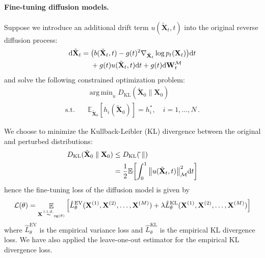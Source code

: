 \documentclass{article}
\theoremstyle{plain}
\theoremstyle{definition}
\theoremstyle{remark}
\DeclareMathOperator*{\argmin}{arg\,min}
\let\P\relax
\DeclareMathOperator{\P}{\mathbb{P}}
\DeclareMathOperator{\E}{\mathbb{E}}
\DeclareMathOperator{\sg}{\mathrm{sg}}
\DeclareMathOperator{\iid}{\overset{\mathrm{i.i.d.}}{\sim}}
\begin{document}
\paragraph{Fine-tuning diffusion models.}
Suppose we introduce an additional drift term $u(\tilde{\mathbf{X}}_t, t)$ into the original reverse diffusion process:
    \begin{equation}
        \begin{aligned}
            \dd\tilde{\mathbf{X}}_t ={} &
            \qty(b(\tilde{\mathbf{X}}_t, t)
            - g(t)^2\nabla_{\tilde{\mathbf{X}}_t}\log p_t(\mathbf{X}_t))\dd t   \\
                                        & + g(t)u(\tilde{\mathbf{X}}_t, t)\dd t
            + g(t)\dd \mathbf{W}_t^\mathcal{M}
        \end{aligned}
    \end{equation}
    and solve the following constrained optimization problem:
    \begin{equation}
        \begin{aligned}
            & \argmin_{u} D_\text{KL}(\tilde{\mathbf{X}}_0\parallel \mathbf{X}_0)   \\
            \text{s.t.} \quad
            & \mathbb{E}_{\tilde{\mathbf{X}}_0}[h_i(\tilde{\mathbf{X}}_0)] = h_i^*,
            \quad i = 1,\dots,N\,.
        \end{aligned}
    \end{equation}

    We choose to minimize the Kullback-Leibler (KL) divergence between the original and perturbed distributions:
    \begin{equation}
        \begin{aligned}
            D_\text{KL}(\tilde{\mathbf{X}}_0\parallel \mathbf{X}_0) & \leq D_\text{KL}(\tilde{\P}\parallel \P) \\
            & = \frac{1}{2}\mathbb{E}_{\tilde{\P}} \qty[\int_0^1 \norm{u(\tilde{\mathbf{X}}_t, t)}_\mathcal{M}^2 \dd t]
        \end{aligned}
    \end{equation}
    hence the fine-tuning loss of the diffusion model is given by
    \begin{equation}
        \mathcal{L}(\theta) = \E_{\mathbf{X} \iid \P_{\sg(\theta)}}\qty[\hat{L}_\theta^\text{EV}(\mathbf{X}^{(1)}, \mathbf{X}^{(2)}, \dots, \mathbf{X}^{(M)}) + \lambda\hat{L}_\theta^\text{KL}(\mathbf{X}^{(1)}, \mathbf{X}^{(2)}, \dots, \mathbf{X}^{(M)})]
    \end{equation}
    where $\hat{L}_\theta^\text{EV}$ is the empirical variance loss and $\hat{L}_\theta^\text{KL}$ is the empirical KL divergence loss. We have also applied the leave-one-out estimator for the empirical KL divergence loss.
\end{document}
